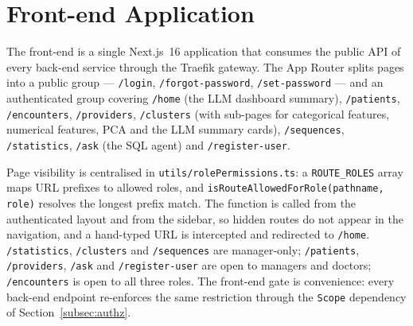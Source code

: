 \section{Front-end Application}

The front-end is a single Next.js~16 application that consumes the public API of every back-end service through the Traefik gateway. The App Router splits pages into a public group --- \texttt{/login}, \texttt{/forgot-password}, \texttt{/set-password} --- and an authenticated group covering \texttt{/home} (the LLM dashboard summary), \texttt{/patients}, \texttt{/encounters}, \texttt{/providers}, \texttt{/clusters} (with sub-pages for categorical features, numerical features, PCA and the LLM summary cards), \texttt{/sequences}, \texttt{/statistics}, \texttt{/ask} (the SQL agent) and \texttt{/register-user}.

Page visibility is centralised in \texttt{utils/rolePermissions.ts}: a \texttt{ROUTE\_ROLES} array maps URL prefixes to allowed roles, and \texttt{isRouteAllowedForRole(pathname, role)} resolves the longest prefix match. The function is called from the authenticated layout and from the sidebar, so hidden routes do not appear in the navigation, and a hand-typed URL is intercepted and redirected to \texttt{/home}. \texttt{/statistics}, \texttt{/clusters} and \texttt{/sequences} are manager-only; \texttt{/patients}, \texttt{/providers}, \texttt{/ask} and \texttt{/register-user} are open to managers and doctors; \texttt{/encounters} is open to all three roles. The front-end gate is convenience: every back-end endpoint re-enforces the same restriction through the \texttt{Scope} dependency of Section~\ref{subsec:authz}.
